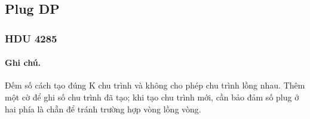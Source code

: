 \documentclass[11pt]{article}
\begin{document}
\subsection{Plug DP}

\subsubsection{HDU 4285}

\paragraph{Ghi chú.} Đếm số cách tạo đúng K chu trình và không cho phép chu trình lồng nhau. Thêm một cờ để ghi số chu trình đã tạo; khi tạo chu trình mới, cần bảo đảm số plug ở hai phía là chẵn để tránh trường hợp vòng lồng vòng.
\end{document}
